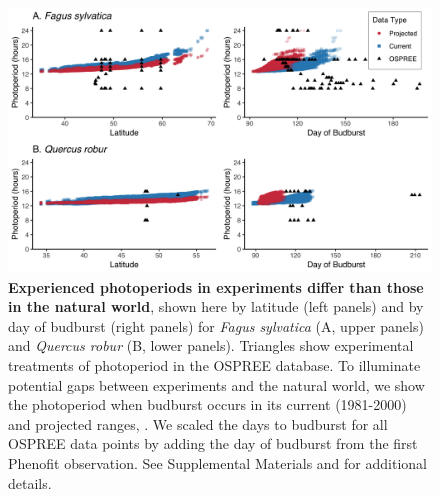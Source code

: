 \documentclass{article}
\begin{document}
 
\begin{figure}[p]
\includegraphics{..//..//analyses/photoperiod/figures/2D_actual_combined.png} 
\caption{\textbf{Experienced photoperiods in experiments differ than those in the natural world}, shown here by latitude (left panels) and by day of budburst (right panels) for \emph{Fagus sylvatica} (A, upper panels) and \emph{Quercus robur} (B, lower panels). Triangles show experimental treatments of photoperiod in the OSPREE database. To illuminate potential gaps between experiments and the natural world, we show the photoperiod when budburst occurs in its current (1981-2000) and projected ranges, \citep[2081-2100, using the A1Fi Phenofit scenario, see][]{duputie2015}. We scaled the days to budburst for all OSPREE data points by adding the day of budburst from the first Phenofit observation. See Supplemental Materials and \citet{duputie2015} for additional details.} 
 \label{fig:fagus}
 \end{figure}
 
\end{document}
